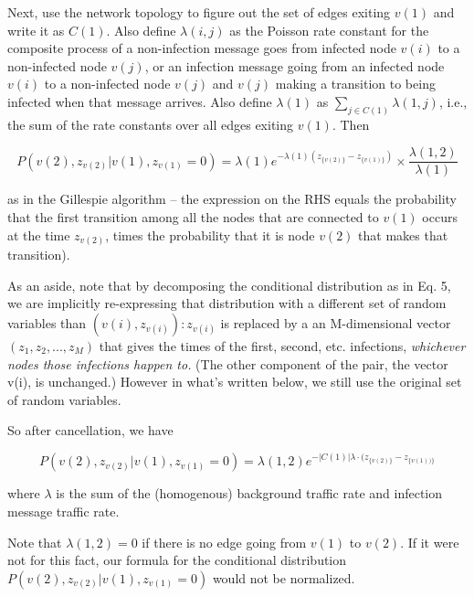 \documentclass{article}
\begin{document}
	Next, use the network topology to figure out the set of edges exiting
	$v(1)$ and write it as $C(1)$. Also define $\lambda(i,j)$ as the Poisson rate
	constant for the composite process of a non-infection message goes
	from infected node $v(i)$ to a non-infected node $v(j)$, or an infection
	message going from an infected node $v(i)$ to a non-infected node $v(j)$
	and $v(j)$ making a transition to being infected when that message
	arrives.  Also define $\lambda(1)$ as $\sum_{j \in C(1)} \lambda(1,j)$,
	i.e., the sum of the rate constants over all edges exiting $v(1)$. Then

\begin{equation}
P(v(2), z_{v(2)} | v(1), z_{v(1)} = 0)  =
\lambda(1) e^{- \lambda(1) (z_{\{v(2)\}} - z_{\{v(1)\}})} 
\times \frac{\lambda(1,2)}{\lambda(1)}
\end{equation}

        as in the Gillespie algorithm -- the
	expression on the RHS equals the probability that the first transition
	among all the nodes that are connected to $v(1)$ occurs at the time
	$z_{v(2)}$, times the probability that it is node $v(2)$ that makes that
	transition). 
        
        As an aside, note that by decomposing the conditional distribution as
        in Eq. 5, we are implicitly re-expressing that distribution with a
        different set of random variables than $(v(i), z_{v(i)}): z_{v(i)}$ is
        replaced by a an M-dimensional vector $(z_1, z_2, ..., z_M)$ that gives
        the times of the first, second, etc. infections, \emph{whichever nodes
        those infections happen to.} (The other component of the pair, the
        vector {v(i)}, is unchanged.) However in what's written below, we
        still use the original set of random variables.

        So after cancellation, we have
	
\begin{equation}
P(v(2), z_{v(2)} | v(1), z_{v(1)} = 0) =
\lambda(1, 2) e^{-|C(1)| \lambda \cdot (z_{\{v(2)\}} - z_{\{v(1))\}}}
\label{orig5}
\end{equation}

	where $\lambda$ is the sum of the (homogenous) background traffic rate
	and infection message traffic rate. 

	Note that $\lambda(1, 2) = 0$ if there is no edge going from $v(1)$ to
	$v(2)$. If it were not for this fact, our formula for the conditional
	distribution $P(v(2), z_{v(2)} | v(1), z_{v(1)} = 0)$ would not be
	normalized.
\end{document}

